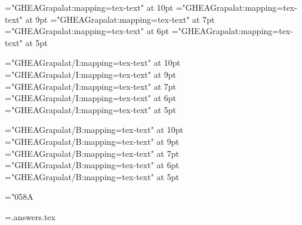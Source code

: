 

\pdfpagewidth=105mm
\pdfpageheight=148.5mm

\hsize=79mm
\vsize=115mm

\hoffset=-12.4mm
\voffset=-12.4mm

\font\armtenrm="GHEAGrapalat:mapping=tex-text" at 10pt
\font\armninerm="GHEAGrapalat:mapping=tex-text" at 9pt
\font\armsevenrm="GHEAGrapalat:mapping=tex-text" at 7pt
\font\armsixrm="GHEAGrapalat:mapping=tex-text" at 6pt
\font\armfiverm="GHEAGrapalat:mapping=tex-text" at 5pt

\font\armtenit="GHEAGrapalat/I:mapping=tex-text" at 10pt
\font\armnineit="GHEAGrapalat/I:mapping=tex-text" at 9pt
\font\armsevenit="GHEAGrapalat/I:mapping=tex-text" at 7pt
\font\armsixit="GHEAGrapalat/I:mapping=tex-text" at 6pt
\font\armfiveit="GHEAGrapalat/I:mapping=tex-text" at 5pt

\font\armtenbf="GHEAGrapalat/B:mapping=tex-text" at 10pt
\font\armninebf="GHEAGrapalat/B:mapping=tex-text" at 9pt
\font\armsevenbf="GHEAGrapalat/B:mapping=tex-text" at 7pt
\font\armsixbf="GHEAGrapalat/B:mapping=tex-text" at 6pt
\font\armfivebf="GHEAGrapalat/B:mapping=tex-text" at 5pt

\def\tenpoint{\def\hy{\fam0\armtenrm}%
  \textfont0=\armtenrm \scriptfont0=\armsevenrm \scriptscriptfont0=\armfiverm
  \def\it{\fam\itfam\armtenit} \textfont\itfam=\armtenit
  \def\bf{\fam\bffam\armtenbf} \textfont\bffam=\armtenbf
    \scriptfont\bffam=\armsevenbf \scriptscriptfont\bffam=\armfivebf
  \normalbaselineskip=14pt
  \setbox\strutbox=\hbox{\vrule height8.5pt depth5.5pt width 0pt}%
  \normalbaselines\hy}

\def\ninepoint{\def\hy{\fam0\armninerm}%
  \textfont0=\armninerm \scriptfont0=\armsixrm \scriptscriptfont0=\armfiverm
  \def\it{\fam\itfam\armnineit} \textfont\itfam=\armnineit
  \def\bf{\fam\bffam\armninebf} \textfont\bffam=\armninebf
    \scriptfont\bffam=\armsixbf \scriptscriptfont\bffam=\armfivebf
  \normalbaselineskip=12.6pt
  \setbox\strutbox=\hbox{\vrule height8pt depth4.6pt width 0pt}%
  \normalbaselines\hy}

\parindent=0pt
\baselineskip=14pt
\frenchspacing
{}
\hyphenchar\armtenrm="058A %

\newcount\problemcount {}
\def\problem{\vfill\eject%
  \advance\problemcount by1%
  {\bf \the\problemcount.}~}

\newwrite\ansf
\immediate\openout\ansf=\jobname.answers.tex
\def\answer#1{\immediate\write\ansf{\the\problemcount. {\noexpand\it #1}}%
  \immediate\write\ansf{}%
  \medskip\mathgrid\medskip\line{Պատասխան՝\dotfill\null}}

